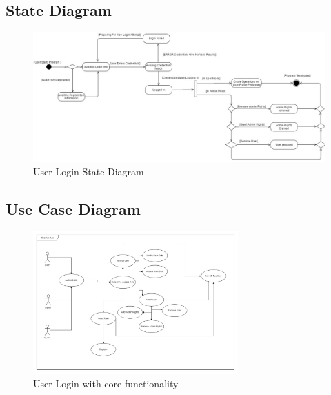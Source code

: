 \subsection{State Diagram}

\begin{figure}[H]
		\centering
		\includegraphics[width=\textwidth]{user/img/UserStateDiagram.jpg}
		\caption{User Login State Diagram}
\end{figure}




\subsection{Use Case Diagram}

\begin{figure}[H]
		\centering
		\includegraphics[width=0.7\textwidth]{user/img/UserUseCase.jpg}
		\caption{User Login with core functionality }
\end{figure}



